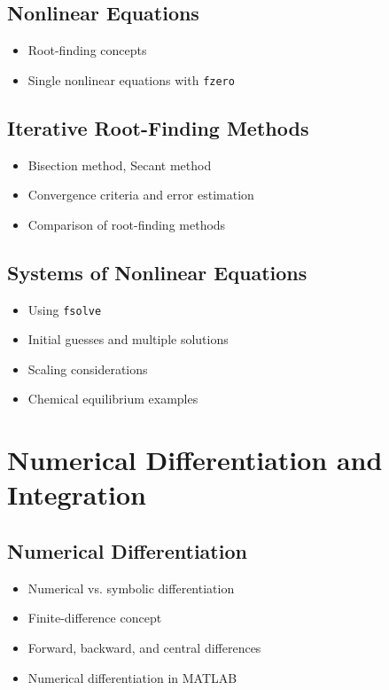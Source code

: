 \documentclass[11pt, a4paper]{article}
\begin{document}
\subsection{Nonlinear Equations}
\begin{itemize}
  \item Root-finding concepts
  \item Single nonlinear equations with \texttt{fzero}
\end{itemize}

\subsection{Iterative Root-Finding Methods}
\begin{itemize}
  \item Bisection method, Secant method
  \item Convergence criteria and error estimation
  \item Comparison of root-finding methods
\end{itemize}

\subsection{Systems of Nonlinear Equations}
\begin{itemize}
  \item Using \texttt{fsolve}
  \item Initial guesses and multiple solutions
  \item Scaling considerations
  \item Chemical equilibrium examples
\end{itemize}

\section{Numerical Differentiation and Integration}

\subsection{Numerical Differentiation}
\begin{itemize}
  \item Numerical vs. symbolic differentiation
  \item Finite-difference concept
  \item Forward, backward, and central differences
  \item Numerical differentiation in MATLAB
\end{itemize}
\end{document}
